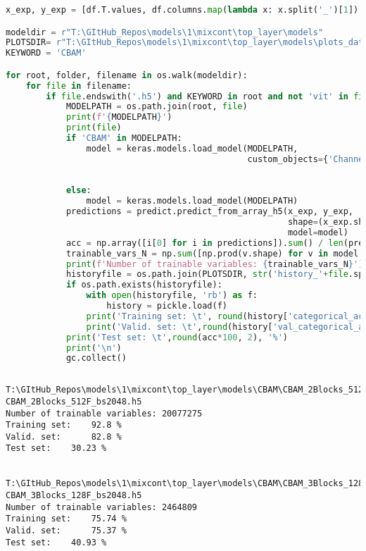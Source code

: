 \begin{lstlisting}[language=Python]
x_exp, y_exp = [df.T.values, df.columns.map(lambda x: x.split('_')[1]).values] # top layer

modeldir = r"T:\GItHub_Repos\models\1\mixcont\top_layer\models"
PLOTSDIR= r"T:\GItHub_Repos\models\1\mixcont\top_layer\models\plots_data"
KEYWORD = 'CBAM'

for root, folder, filename in os.walk(modeldir):
    for file in filename:
        if file.endswith('.h5') and KEYWORD in root and not 'vit' in file:
            MODELPATH = os.path.join(root, file)
            print(f'{MODELPATH}')
            print(file)
            if 'CBAM' in MODELPATH:
                model = keras.models.load_model(MODELPATH,
                                                custom_objects={'ChannelAttention': ChannelAttention,
                                                                           'SpatialAttention': SpatialAttention,
                                                                           'CBAM': functions_tf.CBAM})
            else:
                model = keras.models.load_model(MODELPATH)
            predictions = predict.predict_from_array_h5(x_exp, y_exp,
                                                        shape=(x_exp.shape[0], 1,1024),
                                                        model=model)
            acc = np.array([i[0] for i in predictions]).sum() / len(predictions)
            trainable_vars_N = np.sum([np.prod(v.shape) for v in model.trainable_variables])
            print(f'Number of trainable variables: {trainable_vars_N}')
            historyfile = os.path.join(PLOTSDIR, str('history_'+file.split('.')[0]+'.pkl'))
            if os.path.exists(historyfile):
                with open(historyfile, 'rb') as f:
                    history = pickle.load(f)
                print('Training set: \t', round(history['categorical_accuracy'][-1]*100, 2), '%')
                print('Valid. set: \t',round(history['val_categorical_accuracy'][-1]*100, 2), '%')
            print('Test set: \t',round(acc*100, 2), '%')
            print('\n')
            gc.collect()
            
\end{lstlisting}

\begin{lstlisting}
T:\GItHub_Repos\models\1\mixcont\top_layer\models\CBAM\CBAM_2Blocks_512F_bs2048.h5
CBAM_2Blocks_512F_bs2048.h5
Number of trainable variables: 20077275
Training set: 	 92.8 %
Valid. set: 	 82.8 %
Test set: 	 30.23 %


T:\GItHub_Repos\models\1\mixcont\top_layer\models\CBAM\CBAM_3Blocks_128F_bs2048.h5
CBAM_3Blocks_128F_bs2048.h5
Number of trainable variables: 2464809
Training set: 	 75.74 %
Valid. set: 	 75.37 %
Test set: 	 40.93 %


\end{lstlisting}

